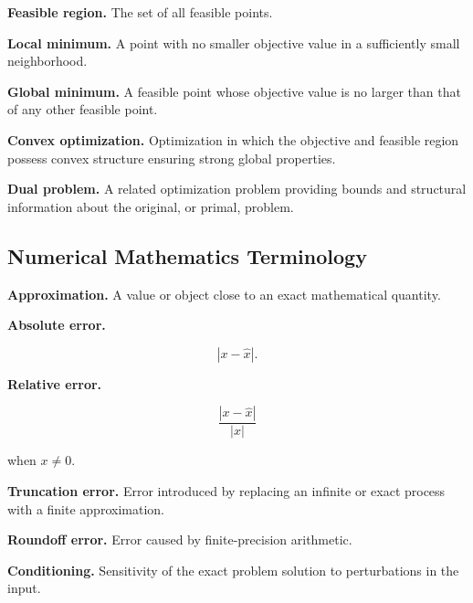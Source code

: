\medskip

\textbf{Feasible region.}
The set of all feasible points.

\medskip

\textbf{Local minimum.}
A point with no smaller objective value in a sufficiently small
neighborhood.

\medskip

\textbf{Global minimum.}
A feasible point whose objective value is no larger than that of any other
feasible point.

\medskip

\textbf{Convex optimization.}
Optimization in which the objective and feasible region possess convex
structure ensuring strong global properties.

\medskip

\textbf{Dual problem.}
A related optimization problem providing bounds and structural information
about the original, or primal, problem.

\subsection{Numerical Mathematics Terminology}
\label{subsec:numerical-terminology-reference}

\textbf{Approximation.}
A value or object close to an exact mathematical quantity.

\medskip

\textbf{Absolute error.}

\[
\boxed{
|x-\hat{x}|.
}
\]

\medskip

\textbf{Relative error.}

\[
\boxed{
\frac{
|x-\hat{x}|
}{
|x|
}
}
\]

when \(x\neq0\).

\medskip

\textbf{Truncation error.}
Error introduced by replacing an infinite or exact process with a finite
approximation.

\medskip

\textbf{Roundoff error.}
Error caused by finite-precision arithmetic.

\medskip

\textbf{Conditioning.}
Sensitivity of the exact problem solution to perturbations in the input.

\medskip

